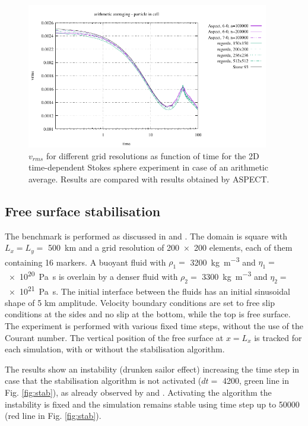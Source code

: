 \documentclass[hidelinks,11pt,a4paper]{article}
\begin{document}
\begin{figure}
\centering
\noindent\includegraphics[width=400px]{./Figures/vrms_arithm.pdf}
\caption{$v_{rms}$ for different grid resolutions as function of time for the 2D time-dependent Stokes sphere experiment in case of an arithmetic average. Results are compared with results obtained by ASPECT.}
\label{fig:inst_spherefs}
\end{figure}

\subsection{Free surface stabilisation}\label{sec:stab}
The benchmark is performed as discussed in \citet{Kaus2010a} and \citet{Thieulot2014}. The domain is square with $L_x=L_y=$ \SI{500}{\km} and a grid resolution of \num{200x200} elements, each of them containing 16 markers. A buoyant fluid with $\rho_1=$ \SI{3200}{\kg\per\cubic\metre} and $\eta_1=$ \SI{e20}{\pascal\s} is overlain by a denser fluid with $\rho_2=$ \SI{3300}{\kg\per\cubic\metre} and $\eta_2=$ \SI{e21}{\pascal\s}. The initial interface between the fluids has an initial sinusoidal shape of 5 km amplitude. Velocity boundary conditions are set to free slip conditions at the sides and no slip at the bottom, while the top is free surface. The experiment is performed with various fixed time steps, without the use of the Courant number. The vertical position of the free surface at $x=L_x$ is tracked for each simulation, with or without the stabilisation algorithm.

The results show an instability (drunken sailor effect) increasing the time step in case that the stabilisation algorithm is not activated ($dt=$ \SI{4200}{\year}, green line in Fig. \ref{fig:stab}), as already observed by \citet{Kaus2010a} and \citet{Thieulot2014}. Activating the algorithm the instability is fixed and the simulation remains stable using time step up to \SI{50000}{\year} (red line in Fig. \ref{fig:stab}).
\end{document}
